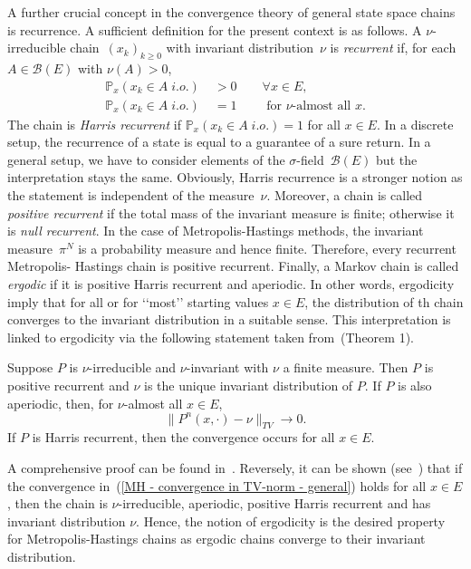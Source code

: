 A further crucial concept in the convergence theory of general state space chains is recurrence. A sufficient definition for the present context is as follows. A $\nu$-irreducible chain~$(x_k)_{k \geq 0} $ with invariant distribution~$\nu$ is \textit{recurrent} if, for each~$A \in \mathcal{B}(E) $ with $\nu(A) > 0 $, 
\begin{align}
 \mathbb{P}_x (x_k \in A \; i.o. ) & \; > 0 \qquad \forall x \in E, \\
 \mathbb{P}_x (x_k \in A \; i.o.) & \; = 1 \qquad \text{ for $\nu$-almost all } x.
\end{align}
The chain is \textit{Harris recurrent} if $ \mathbb{P}_x(x_k \in A \; i.o.) = 1 $ for all $x \in E$. In a discrete setup, the recurrence of a state is equal to a guarantee of a sure return. In a general setup, we have to consider elements of the $\sigma$-field~$\mathcal{B}(E)$ but the interpretation stays the same. Obviously, Harris recurrence is a stronger notion as the statement is independent of the measure~$\nu$. Moreover, a chain is called \textit{positive recurrent} if the total mass of the invariant measure is finite; otherwise it is \textit{null recurrent}. In the case of Metropolis-Hastings methods, the invariant measure~$\pi^{N}$ is a probability measure and hence finite. Therefore, every recurrent Metropolis- Hastings chain is positive recurrent. Finally, a Markov chain is called \textit{ergodic} if it is positive Harris recurrent and aperiodic. In other words, ergodicity imply that for all or for ‘‘most’’ starting values $x \in E$, the distribution of th chain converges to the invariant distribution in a suitable sense. This interpretation is linked to ergodicity via the following statement taken from~\autocite{Tierny1994}(Theorem 1).

\begin{thm}
 Suppose $P$ is $\nu$-irreducible and $\nu$-invariant with $\nu$ a finite measure. Then $P$ is positive recurrent and $\nu$ is the unique invariant distribution of $P$. If $P$ is also aperiodic, then, for $\nu$-almost all $x \in E$,
 \begin{equation}
 \label{MH - convergence in TV-norm - general}
  \| P^n (x, \cdot) - \nu \|_{TV} \to 0.
 \end{equation}
 If $P$ is Harris recurrent, then the convergence occurs for all $x \in E$.

\end{thm}

A comprehensive proof can be found in~\autocite{Athreya1996}. Reversely, it can be shown (see~\autocite{Tierny1994}) that if the convergence in~(\ref{MH - convergence in TV-norm - general}) holds for all $x \in E$, then the chain is $\nu$-irreducible, aperiodic, positive Harris recurrent and has invariant distribution $\nu$. Hence, the notion of ergodicity is the desired property for Metropolis-Hastings chains as ergodic chains converge to their invariant distribution.


